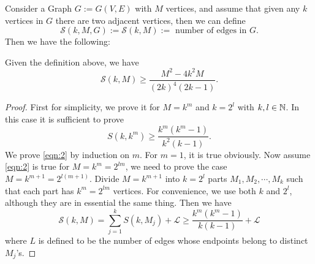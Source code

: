 Consider a Graph $G:=G(V,E)$ with $M$ vertices, and assume that given any $k$ vertices in $G$ there are two adjacent vertices, then we can define
\[
\mathcal{S}(k,M,G):=\mathcal{S}(k,M):= \text{ number of edges in } G.
\]
Then we have the following:
\begin{theorem}
	Given the definition above, we have
	\begin{equation}
		\mathcal{S}(k,M)\ge \frac{M^2-4k^2M}{(2k)^{4}(2k-1)}.
	\end{equation}
\end{theorem}

\begin{proof}
	First for simplicity, we prove it for $M=k^{m}$ and $k=2^{l}$ with $k,l \in \mathbb{N}$. In this case it is sufficient to prove
	\begin{equation}\label{eqn:2}
	S(k,k^{m})\ge \frac{k^{m}(k^{m}-1)}{k^2(k-1)}.
\end{equation}
We prove \cref{eqn:2} by induction on $m$. For $m=1$, it is true obviously. Now assume \cref{eqn:2} is true for $M=k^{m}=2^{lm}$, we need to prove the case $M=k^{m+1}=2^{l(m+1)}$. Divide $M=k^{m+1}$ into $k=2^{l}$ parts  $M_1,M_2,\cdots ,M_k$ such that each part has $k^{m}=2^{lm}$ vertices. For convenience, we use both $k$ and  $2^{l}$, although they are in essential the same thing. Then we have
\[
\mathcal{S}(k,M)=\sum_{j=1}^{k} S(k,M_j)+ \mathcal{L}\ge \frac{k^{m}(k^{m}-1)}{k(k-1)}+\mathcal{L}
\] where $L$ is defined to be the number of edges whose endpoints belong to distinct $M_j$'s.


\end{proof}
